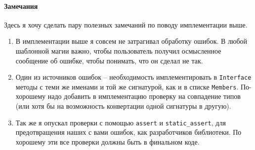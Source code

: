 \paragraph{Замечания}

Здесь я хочу сделать пару полезных замечаний по поводу имплементации выше.
\begin{enumerate}
\item В имплементации выше я совсем не затрагивал обработку ошибок.
В любой шаблонной магии важно, чтобы пользователь получил осмысленное сообщение об ошибке, чтобы понимать, что он сделал не так.

\item Один из источников ошибок -- необходимость имплементировать в \verb"Interface" методы с теми же именами и той же сигнатурой, как и в списке \verb"Members".
По-хорошему надо добавить в имплементацию проверку на совпадение типов (или хотя бы на возможность конвертации одной сигнатуры в другую).

\item Так же я опускал проверки с помощью \verb"assert" и \verb"static_assert", для предотвращения наших с вами ошибок, как разработчиков библиотеки.
По хорошему эти все проверки должны быть в финальном коде.
\end{enumerate}
